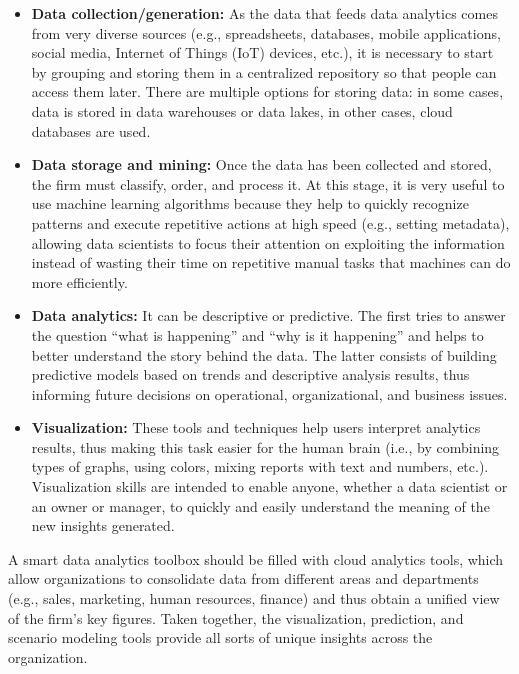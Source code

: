 \documentclass[
  letterpaper,
  DIV=11,
  numbers=noendperiod]{scrreprt}
\begin{document}
\begin{itemize}
\item
  \textbf{Data collection/generation:} As the data that feeds data
  analytics comes from very diverse sources (e.g., spreadsheets,
  databases, mobile applications, social media, Internet of Things (IoT)
  devices, etc.), it is necessary to start by grouping and storing them
  in a centralized repository so that people can access them later.
  There are multiple options for storing data: in some cases, data is
  stored in data warehouses or data lakes, in other cases, cloud
  databases are used.
\item
  \textbf{Data storage and mining:} Once the data has been collected and
  stored, the firm must classify, order, and process it. At this stage,
  it is very useful to use machine learning algorithms because they help
  to quickly recognize patterns and execute repetitive actions at high
  speed (e.g., setting metadata), allowing data scientists to focus
  their attention on exploiting the information instead of wasting their
  time on repetitive manual tasks that machines can do more efficiently.
\item
  \textbf{Data analytics:} It can be descriptive or predictive. The
  first tries to answer the question ``what is happening'' and ``why is
  it happening'' and helps to better understand the story behind the
  data. The latter consists of building predictive models based on
  trends and descriptive analysis results, thus informing future
  decisions on operational, organizational, and business issues.
\item
  \textbf{Visualization:} These tools and techniques help users
  interpret analytics results, thus making this task easier for the
  human brain (i.e., by combining types of graphs, using colors, mixing
  reports with text and numbers, etc.). Visualization skills are
  intended to enable anyone, whether a data scientist or an owner or
  manager, to quickly and easily understand the meaning of the new
  insights generated.
\end{itemize}

A smart data analytics toolbox should be filled with cloud analytics
tools, which allow organizations to consolidate data from different
areas and departments (e.g., sales, marketing, human resources, finance)
and thus obtain a unified view of the firm's key figures. Taken
together, the visualization, prediction, and scenario modeling tools
provide all sorts of unique insights across the organization.
\end{document}
